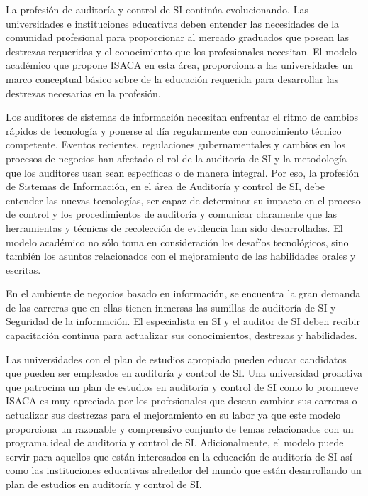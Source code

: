 \begin{syllabus}


\begin{justification}
	La profesión de auditoría y control de SI continúa evolucionando. Las universidades e
	instituciones educativas deben entender las necesidades de la comunidad profesional
	para proporcionar al mercado graduados que posean las destrezas requeridas y el
	conocimiento que los profesionales necesitan. El modelo académico que propone
	ISACA en esta área, proporciona a las universidades un marco conceptual básico
	sobre de la educación requerida para desarrollar las destrezas necesarias en la
	profesión.
	
	Los auditores de sistemas de información necesitan enfrentar el ritmo de cambios
	rápidos de tecnología y ponerse al día regularmente con conocimiento técnico
	competente. Eventos recientes, regulaciones gubernamentales y cambios en los
	procesos de negocios han afectado el rol de la auditoría de SI y la metodología que los
	auditores usan sean específicas o de manera integral. Por eso, la profesión de
	Sistemas de Información, en el área de Auditoría y control de SI, debe entender las
	nuevas tecnologías, ser capaz de determinar su impacto en el proceso de control y los
	procedimientos de auditoría y comunicar claramente que las herramientas y técnicas
	de recolección de evidencia han sido desarrolladas. El modelo académico no sólo
	toma en consideración los desafíos tecnológicos, sino también los asuntos
	relacionados con el mejoramiento de las habilidades orales y escritas.
	
	En el ambiente de negocios basado en información, se encuentra la gran demanda de
	las carreras que en ellas tienen inmersas las sumillas de auditoría de SI y Seguridad
	de la información. El especialista en SI y el auditor de SI deben recibir capacitación
	continua para actualizar sus conocimientos, destrezas y habilidades.
	
	Las universidades con el plan de estudios apropiado pueden educar candidatos que
	pueden ser empleados en auditoría y control de SI. Una universidad proactiva que
	patrocina un plan de estudios en auditoría y control de SI como lo promueve ISACA es
	muy apreciada por los profesionales que desean cambiar sus carreras o actualizar sus
	destrezas para el mejoramiento en su labor ya que este modelo proporciona un
	razonable y comprensivo conjunto de temas relacionados con un programa ideal de
	auditoría y control de SI. Adicionalmente, el modelo puede servir para aquellos que
	están interesados en la educación de auditoría de SI así­ como las instituciones
	educativas alrededor del mundo que están desarrollando un plan de estudios en
	auditoría y control de SI.
	\end{justification}
	

\end{syllabus}

